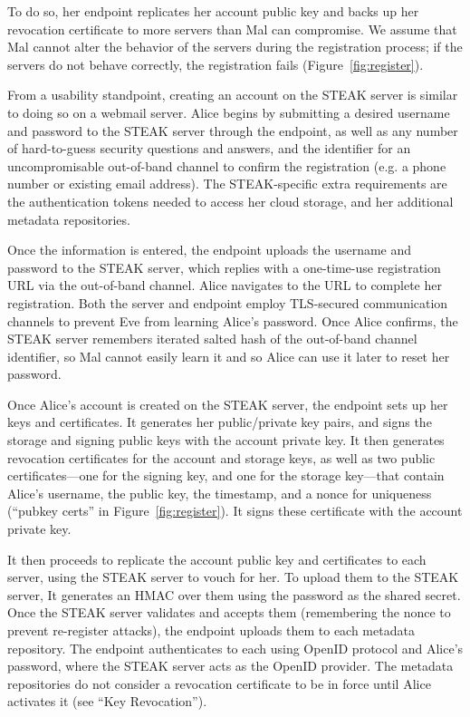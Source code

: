 To do so, her endpoint replicates her account public key and backs up her revocation certificate to more servers than Mal can compromise.  We assume that Mal cannot alter the behavior of the servers during the registration process; if the servers do not behave correctly, the registration fails (Figure~\ref{fig:register}).

From a usability standpoint, creating an account on the STEAK server is similar to doing so on a webmail server.  Alice begins by submitting a desired username and password to the STEAK server through the endpoint, as well as any number of hard-to-guess security questions and answers, and the identifier for an uncompromisable out-of-band channel to confirm the registration (e.g. a phone number or existing email address).  The STEAK-specific extra requirements are the authentication tokens needed to access her cloud storage, and her additional metadata repositories.

Once the information is entered, the endpoint uploads the username and password to the STEAK server, which replies with a one-time-use registration URL via the out-of-band channel.  Alice navigates to the URL to complete her registration.  Both the server and endpoint employ TLS-secured communication channels to prevent Eve from learning Alice’s password.  Once Alice confirms, the STEAK server remembers iterated salted hash of the out-of-band channel identifier, so Mal cannot easily learn it and so Alice can use it later to reset her password.

Once Alice’s account is created on the STEAK server, the endpoint sets up her keys and certificates.  It generates her public/private key pairs, and signs the storage and signing public keys with the account private key.  It then generates revocation certificates for the account and storage keys, as well as two public certificates---one for the signing key, and one for the storage key---that contain Alice’s username, the public key, the timestamp, and a nonce for uniqueness (“pubkey certs” in Figure~\ref{fig:register}).  It signs these certificate with the account private key.

It then proceeds to replicate the account public key and certificates to each server, using the STEAK server to vouch for her.  To upload them to the STEAK server, It generates an HMAC over them using the password as the shared secret.  Once the STEAK server validates and accepts them (remembering the nonce to prevent re-register attacks), the endpoint uploads them to each metadata repository.  The endpoint authenticates to each using OpenID protocol and Alice’s password, where the STEAK server acts as the OpenID provider.  The metadata repositories do not consider a revocation certificate to be in force until Alice activates it (see “Key Revocation”).

